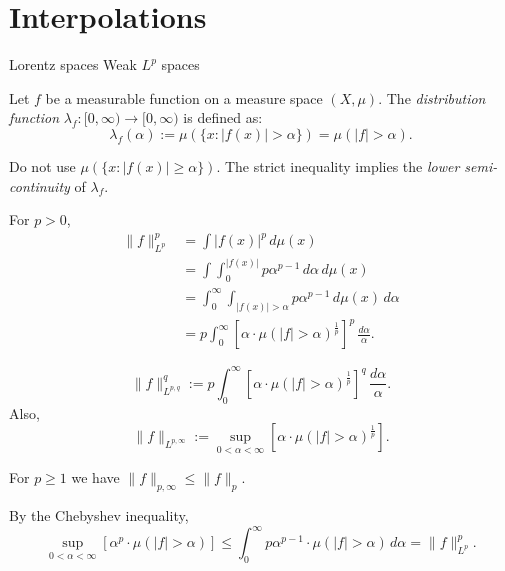 \documentclass{../../large}
\begin{document}
\section{Interpolations}

Lorentz spaces
Weak $L^p$ spaces

\begin{defn}
Let $f$ be a measurable function on a measure space $(X,\mu)$.
The \emph{distribution function} $\lambda_f:[0,\infty)\to [0,\infty)$ is defined as:
\[\lambda_f(\alpha):=\mu(\{x:|f(x)|>\alpha\})=\mu(|f|>\alpha).\]
\end{defn}

Do not use $\mu(\{x:|f(x)|\ge\alpha\})$.
The strict inequality implies the \emph{lower semi-continuity} of $\lambda_f$.


For $p>0$,
\begin{align*}
\|f\|_{L^p}^p
&=\int|f(x)|^p\,d\mu(x)\\
&=\int\int_0^{|f(x)|}p\alpha^{p-1}\,d\alpha\,d\mu(x)\\
&=\int_0^\infty\int_{|f(x)|>\alpha}p\alpha^{p-1}\,d\mu(x)\,d\alpha\\
&=p\int_0^\infty\left[\alpha\cdot\mu(|f|>\alpha)^\frac1p\right]^p\,\frac{d\alpha}\alpha.
\end{align*}

\begin{defn}
\[\|f\|_{L^{p,q}}^q:=p\int_0^\infty\left[\alpha\cdot\mu(|f|>\alpha)^\frac1p\right]^q\,\frac{d\alpha}\alpha.\]
Also,
\[\|f\|_{L^{p,\infty}}:=\sup_{0<\alpha<\infty}\left[\alpha\cdot\mu(|f|>\alpha)^\frac1p\right].\]
\end{defn}
\begin{thm}
For $p\ge1$ we have $\|f\|_{p,\infty}\le\|f\|_p$.
\end{thm}
\begin{pf}
By the Chebyshev inequality,
\[\sup_{0<\alpha<\infty}\left[\alpha^p\cdot\mu(|f|>\alpha)\right]\le\int_0^\infty p\alpha^{p-1}\cdot\mu(|f|>\alpha)\,d\alpha=\|f\|_{L^p}^p.\]

\end{pf}
\end{document}
